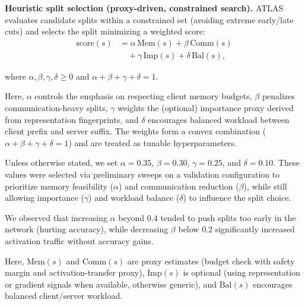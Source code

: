 \documentclass[conference]{IEEEtran}
\begin{document}
\textbf{Heuristic split selection (proxy-driven, constrained search).}
ATLAS evaluates candidate splits within a constrained set (avoiding extreme early/late cuts) and selects the split minimizing a weighted score:
\begin{equation}
\begin{aligned}
\mathrm{score}(s)
&= \alpha \,\mathrm{Mem}(s)
 + \beta \,\mathrm{Comm}(s) \\
&\quad + \gamma \,\mathrm{Imp}(s)
 + \delta \,\mathrm{Bal}(s),
\end{aligned}
\label{eq:split_score}
\end{equation}

where $\alpha, \beta, \gamma, \delta \ge 0$ and $\alpha + \beta + \gamma + \delta = 1$.

Here, $\alpha$ controls the emphasis on respecting client memory budgets,
$\beta$ penalizes communication-heavy splits, $\gamma$ weights
the (optional) importance proxy derived from representation fingerprints, and $\delta$
encourages balanced workload between client prefix and server suffix. The weights form a convex
combination ($\alpha + \beta + \gamma + \delta = 1$) and are treated as tunable hyperparameters.

Unless otherwise stated, we set $\alpha = 0.35$, $\beta = 0.30$, $\gamma = 0.25$, and $\delta = 0.10$.
These values were selected via preliminary sweeps on a validation configuration to prioritize
memory feasibility ($\alpha$) and communication reduction ($\beta$), while still allowing
importance ($\gamma$) and workload balance ($\delta$) to influence the split choice.

We observed that increasing $\alpha$ beyond $0.4$ tended to push splits too early
in the network (hurting accuracy), while decreasing $\beta$ below $0.2$
significantly increased activation traffic without accuracy gains.

Here, $\mathrm{Mem}(s)$ and $\mathrm{Comm}(s)$ are proxy estimates (budget check with safety margin and activation-transfer proxy), $\mathrm{Imp}(s)$ is optional (using representation or gradient signals when available, otherwise generic), and $\mathrm{Bal}(s)$ encourages balanced client/server workload.
\end{document}

